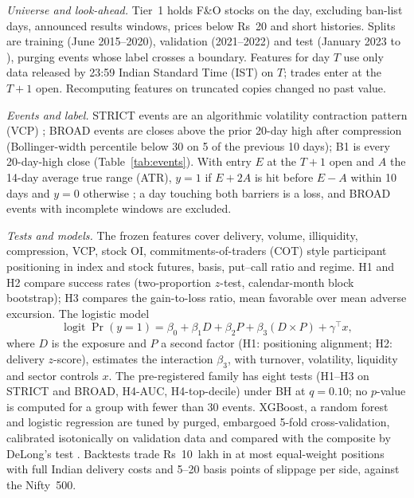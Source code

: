 \documentclass[conference]{IEEEtran}
\begin{document}
\emph{Universe and look-ahead.} Tier~1 holds F\&O stocks on the day, excluding ban-list days, announced
results windows, prices below Rs~20 and short histories. Splits are training (June 2015--2020), validation
(2021--2022) and test (January 2023 to \DataEnd), purging events whose label crosses a boundary. Features for
day $T$ use only data released by 23:59 Indian Standard Time (IST) on $T$; trades enter at the $T+1$ open.
Recomputing features on \NGOneChecks{} truncated copies changed no past value.

\emph{Events and label.} STRICT events are an algorithmic volatility contraction pattern (VCP)
\cite{minervini2013}; BROAD events are closes above the prior 20-day high after compression (Bollinger-width
percentile below 30 on 5 of the previous 10 days); B1 is every 20-day-high close (Table~\ref{tab:events}).
With entry $E$ at the $T+1$ open and $A$ the 14-day average true range (ATR), $y=1$ if $E+2A$ is hit before
$E-A$ within 10 days and $y=0$ otherwise \cite{lopezdeprado2018}; a day touching both barriers is a loss, and
\IncompleteBroad{} BROAD events with incomplete windows are excluded.




\emph{Tests and models.} The \NFeatures{} frozen features cover delivery, volume, illiquidity, compression,
VCP, stock OI, commitments-of-traders (COT) style participant positioning in index and stock futures, basis,
put--call ratio and regime. H1 and H2 compare success rates (two-proportion $z$-test, calendar-month block
bootstrap); H3 compares the gain-to-loss ratio, mean favorable over mean adverse excursion. The logistic model
\begin{equation}
\operatorname{logit}\Pr(y=1)=\beta_0+\beta_1 D+\beta_2 P+\beta_3 (D\times P)+\gamma^{\top}x,
\label{eq:logit}
\end{equation}
where $D$ is the exposure and $P$ a second factor (H1: positioning alignment; H2: delivery $z$-score),
estimates the interaction $\beta_3$, with turnover, volatility, liquidity and sector controls $x$. The
pre-registered family has eight tests (H1--H3 on STRICT and BROAD, H4-AUC, H4-top-decile) under BH at
$q=0.10$; no $p$-value is computed for a group with fewer than 30 events. XGBoost, a random forest and logistic
regression are tuned by purged, embargoed 5-fold cross-validation, calibrated isotonically on validation data
and compared with the composite by DeLong's test \cite{delong1988}. Backtests trade Rs~10~lakh in at most
\MaxPositions{} equal-weight positions with full Indian delivery costs and 5--20 basis points of slippage per
side, against the Nifty~500.
\end{document}
